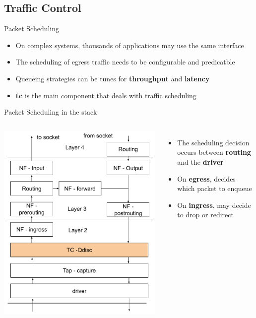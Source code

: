 \subsection{Traffic Control}

\begin{frame}{Packet Scheduling}
	\begin{itemize}
		\item On complex systems, thousands of applications may use the same interface
		\item The scheduling of egress traffic needs to be configurable and predicatble
		\item Queueing strategies can be tunes for \textbf{throughput} and \textbf{latency}
		\item \textbf{tc} is the main component that deals with traffic scheduling
	\end{itemize}
\end{frame}

\begin{frame}{Packet Scheduling in the stack}
	\begin{columns}
		\includegraphics[width=1\textwidth]{slides/networking-traffic-control/routing_tc.pdf}
		\begin{itemize}
			\item The scheduling decision occurs between \textbf{routing} and the \textbf{driver}
			\item On \textbf{egress}, decides which packet to enqueue
			\item On \textbf{ingress}, may decide to drop or redirect
		\end{itemize}
	\end{columns}
\end{frame}

